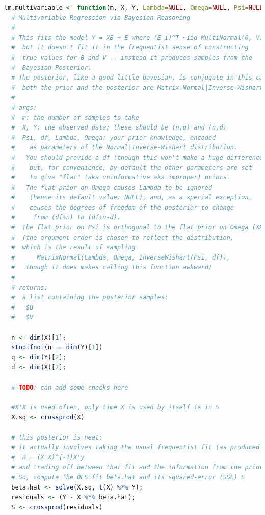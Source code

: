 \documentclass[english]{report}
\begin{document}

\begin{lstlisting}[frame=single, language=R]
lm.multivariable <- function(m, X, Y, Lambda=NULL, Omega=NULL, Psi=NULL, df=71) { # TODO: Not sure what to name this.
  # Multivariable Regression via Bayesian Reasoning
  # 
  # This fits the model Y = XB + E where (E_i)^T ~iid MultiNormal(0, V)
  #  but it doesn't fit it in the frequentist sense of constructing
  #  true values for B and V -- instead it produces samples from the
  #  Bayesian Posterior.
  # The posterior, like a good little bayesian, is conjugate in this case:
  #  both the prior and the posterior are Matrix-Normal|Inverse-Wisharts.
  #
  # args:
  #  m: the number of samples to take
  #  X, Y: the observed data; these should be (n,q) and (n,d)
  #  Psi, df, Lambda, Omega: your prior knowledge, encoded
  #    as parameters of the Normal|Inverse-Wishart distribution.
  #   You should provide a df (though this won't make a huge difference)
  #    but, for convenience, by default the other parameters are set
  #    to give "flat" (aka uninformative aka improper) priors. 
  #   The flat prior on Omega causes Lambda to be ignored
  #    (hence its default value: NULL), and, as a special exception,
  #    causes the degrees of freedom of the posterior to change
  #     from (df+n) to (df+n-d).
  #  The flat prior on Psi is orthogonal to the flat prior on Omega (XXX is this true? surely it has some effect, even if only numerical/speed/something)
  #  (the argument order is chosen to reflect the distribution,
  #  which is the result of sampling
  #      MatrixNormal(Lambda, Omega, InverseWishart(Psi, df)), 
  #   though it does makes calling this function awkward)
  # 
  # returns:
  #  a list containing the posterior samples:
  #   $B
  #   $V
  
  n <- dim(X)[1];
  stopifnot(n == dim(Y)[1])
  q <- dim(Y)[2];
  d <- dim(X)[2];
  
  # TODO: can add some checks here
  
  #X'X is used often, only time X is used by itself is in S
  X.sq <- crossprod(X)
  
  # this posterior is neat:
  # it actually involves taking the usual frequentist fit (as produced by lm())
  #  B = (X'X)^{-1}X'y
  # and trading off between that fit and the information from the prior.
  # So, compute the OLS fit beta.hat and its squared-error (SSE) S 
  beta.hat <- solve(X.sq, t(X) %*% Y);
  residuals <- (Y - X %*% beta.hat);
  S <- crossprod(residuals)
  

\end{lstlisting}
\end{document}
